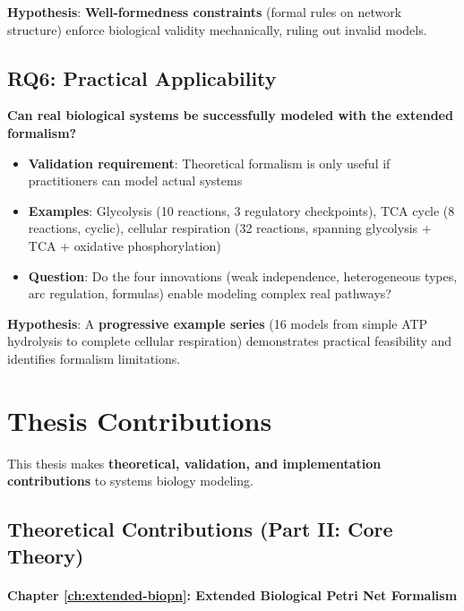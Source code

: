 \textbf{Hypothesis}: \textbf{Well-formedness constraints} (formal rules on network structure) enforce biological validity mechanically, ruling out invalid models.

\subsection{RQ6: Practical Applicability}
\label{subsec:rq6}

\textbf{Can real biological systems be successfully modeled with the extended formalism?}

\begin{itemize}
    \item \textbf{Validation requirement}: Theoretical formalism is only useful if practitioners can model actual systems
    \item \textbf{Examples}: Glycolysis (10 reactions, 3 regulatory checkpoints), TCA cycle (8 reactions, cyclic), cellular respiration (32 reactions, spanning glycolysis + TCA + oxidative phosphorylation)
    \item \textbf{Question}: Do the four innovations (weak independence, heterogeneous types, arc regulation, formulas) enable modeling complex real pathways?
\end{itemize}

\textbf{Hypothesis}: A \textbf{progressive example series} (16 models from simple ATP hydrolysis to complete cellular respiration) demonstrates practical feasibility and identifies formalism limitations.

\section{Thesis Contributions}
\label{sec:contributions}

This thesis makes \textbf{theoretical, validation, and implementation contributions} to systems biology modeling.

\subsection{Theoretical Contributions (Part II: Core Theory)}
\label{subsec:theoretical-contributions}

\paragraph{Chapter \ref{ch:extended-biopn}: Extended Biological Petri Net Formalism}

